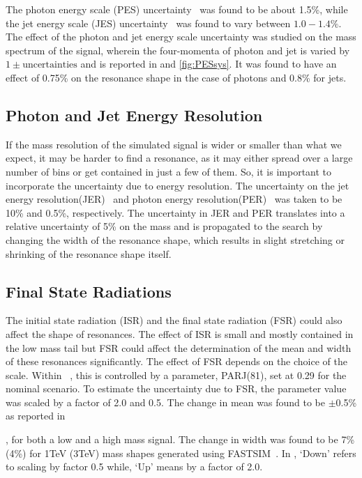 The photon energy scale (\gls{PES}) uncertainty~\cite{Chatrchyan:2011ds,Chatrchyan:2013fya} was found to be about 1.5\%, while the jet energy scale (\gls{JES}) 
uncertainty~\cite{Chatrchyan:2011ds} was found to vary between $1.0-1.4\%$. The effect of the photon and jet energy scale uncertainty was studied on 
the \gamjet mass spectrum of the \qstar signal, wherein the four-momenta of photon and jet is varied by $1\pm\text{uncertainties}$ and is reported in 
\fig{\ref{fig:JESsys}} and \ref{fig:PESsys}. It was found to have an effect of 0.75\% on the \qstar resonance shape in the case of photons and 
0.8\% for jets. 

\subsection{Photon and Jet Energy Resolution}
If the \gamjet mass resolution of the simulated \qstar signal is wider or smaller than what we expect, it may be harder to find a resonance, as it 
may either spread over a large number of bins or get contained in just a few of them. So, it is important to incorporate the uncertainty due to 
energy resolution. The uncertainty on the jet energy resolution(JER)~\cite{Chatrchyan:2011ds} and photon energy resolution(PER)~\cite
{Chatrchyan:2013dga} was taken to be 10\% and 0.5\%, respectively. The uncertainty in \gls{JER} and \gls{PER} translates into a relative uncertainty of 5\% on the 
\gamjet mass and is propagated to the search by changing the width of the resonance shape, which results in slight stretching or shrinking of the 
resonance shape itself.

\subsection{Final State Radiations}
The initial state radiation (\gls{ISR}) and the final state radiation (\gls{FSR})  could also affect the shape of \qstar resonances. The effect of ISR is 
small and mostly contained in the low mass tail but FSR could affect the determination of the mean and width of these resonances significantly. 
The effect of FSR depends on the choice of the scale. Within \pythia~\cite{Sjostrand:2006za}, this is controlled by a parameter, PARJ(81), 
set at 0.29 for the nominal scenario. To estimate the uncertainty due to FSR, the parameter value was scaled by a factor of 2.0 and 0.5. The change 
in mean was found to be $\pm$0.5\% as reported in 

\tab{\ref{Table:FSRUnc}}, for both a low and a high mass signal. The change in width was found to be 7\% (4\%) for 1\unit{TeV} (3\unit{TeV}) \qstar 
mass shapes generated using FASTSIM~\cite{Giammanco:2014bza}. In \tab{\ref{Table:FSRUnc}}, `Down' refers to scaling by factor 0.5 while, `Up' means by 
a factor of 2.0.

